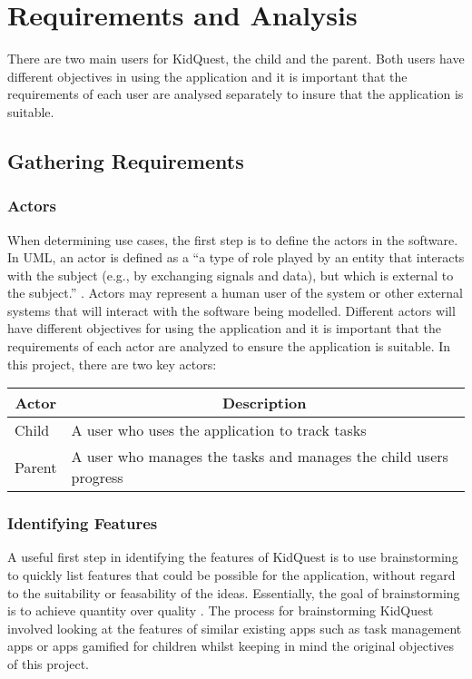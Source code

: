 \chapter{Requirements and Analysis}
\label{chap:methodology}

There are two main users for KidQuest, the child and the parent. 
Both users have different objectives in using the application and it is important that the requirements of each user are analysed separately to insure that the application is suitable.

\section{Gathering Requirements}
\subsection{Actors}
When determining use cases, the first step is to define the actors in the software.
In UML, an actor is defined as a ``a type of role played by an entity that interacts with the subject (e.g., by exchanging signals and data), but which is external to the subject.'' \citep[p586-588]{omg2007unified}.
Actors may represent a human user of the system or other external systems that will interact with the software being modelled.
Different actors will have different objectives for using the application and it is important that the requirements of each actor are analyzed to ensure the application is suitable.
In this project, there are two key actors:

\begin{center}
\begin{tabular}{|p{2cm}|p{8cm}|}  
	\hline
	\multicolumn{1}{|c|}{Actor} & \multicolumn{1}{|c|}{Description} \\ \hline
	Child & A user who uses the application to track tasks \\ \hline
	Parent & A user who manages the tasks and manages the child users progress \\ \hline
\end{tabular}
\end{center}

\subsection{Identifying Features}
A useful first step in identifying the features of KidQuest is to use brainstorming to quickly list features that could be possible for the application, without regard to the suitability or feasability of the ideas.
Essentially, the goal of brainstorming is to achieve quantity over quality \citep[p.144]{leffingwell2000managing}.
The process for brainstorming KidQuest involved looking at the features of similar existing apps such as task management apps or apps gamified for children whilst keeping in mind the original objectives of this project.

